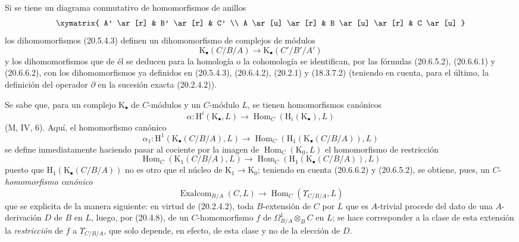Si se tiene un diagrama conmutativo de homomorfismos de anillos
\[
\xymatrix{
  A' \ar[r] & B' \ar[r] & C' \\
  A \ar[u] \ar[r] & B \ar[u] \ar[r] & C \ar[u]
}
\]
los dihomomorfismos (20.5.4.3) definen un dihomomorfismo de
complejos de módulos
\begin{equation}
\tag{20.6.6.4}
\label{0.20.6.6.4-fr}
  \mathrm{K}_\bullet(C/B/A)\longrightarrow
  \mathrm{K}_\bullet(C'/B'/A')
\end{equation}
y los dihomomorfismos que de él se deducen para la homología o la
cohomología se identifican, por las fórmulas (20.6.5.2), (20.6.6.1) y
(20.6.6.2), con los dihomomorfismos ya definidos en (20.5.4.3),
(20.6.4.2), (20.2.1) y (18.3.7.2) (teniendo en cuenta, para el último, la
definición del operador $\partial$ en la sucesión exacta (20.2.4.2)).

\begin{env}[20.6.7]
\label{0.20.6.7-fr}
Se sabe que, para un complejo $\mathrm{K}_\bullet$ de $C$-módulos y un
$C$-módulo $L$, se tienen homomorfismos canónicos
\[
  \alpha:\mathrm{H}^i(\mathrm{K}_\bullet,L)\longrightarrow
  \operatorname{Hom}_C(\mathrm{H}_i(\mathrm{K}_\bullet),L)
\]
(M, IV, 6). Aquí, el homomorfismo canónico
\[
  \alpha_1:\mathrm{H}^1(\mathrm{K}_\bullet(C/B/A),L)
  \longrightarrow
  \operatorname{Hom}_C(\mathrm{H}_1(\mathrm{K}_\bullet(C/B/A)),L)
\]
se define inmediatamente haciendo pasar al cociente por la imagen
de $\operatorname{Hom}_C(\mathrm{K}_0,L)$ el homomorfismo de restricción
\[
  \operatorname{Hom}_C(\mathrm{K}_1(C/B/A),L)\longrightarrow
  \operatorname{Hom}_C(\mathrm{H}_1(\mathrm{K}_\bullet(C/B/A)),L)
\]
puesto que $\mathrm{H}_1(\mathrm{K}_\bullet(C/B/A))$ no es otro que el
núcleo de $\mathrm{K}_1\to\mathrm{K}_0$; teniendo en cuenta (20.6.6.2) y
(20.6.5.2), se obtiene, pues, un $C$-\emph{homomorfismo canónico}
\begin{equation}
\tag{20.6.7.1}
\label{0.20.6.7.1-fr}
  \operatorname{Exalcom}_{B/A}(C,L)\longrightarrow
  \operatorname{Hom}_C(\Upsilon_{C/B/A},L)
\end{equation}
que se explicita de la manera siguiente: en virtud de (20.2.4.2), toda
$B$-extensión de $C$ por $L$ que es $A$-trivial procede del dato
de una $A$-derivación $D$ de $B$ en $L$, luego, por (20.4.8), de un
$C$-homomorfismo $f$ de $\Omega^1_{B/A}\otimes_B C$ en $L$; se hace
corresponder a la clase de esta extensión la \emph{restricción} de $f$
a $\Upsilon_{C/B/A}$, que solo depende, en efecto, de esta clase y
no de la elección de $D$.
\end{env}

